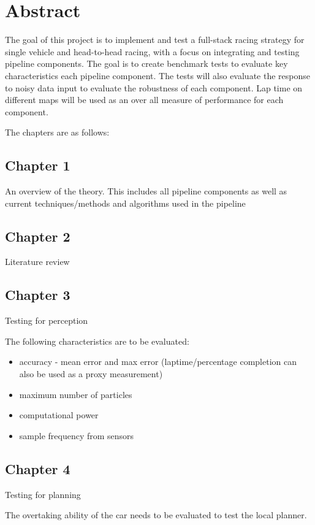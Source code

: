 \chapter{Abstract}

The goal of this project is to implement and test a full-stack racing strategy for single vehicle and head-to-head racing, with a focus on integrating and testing pipeline components. The goal is to create benchmark tests to evaluate key characteristics each pipeline component. The tests will also evaluate the response to noisy data input to evaluate the robustness of each component. Lap time on different maps will be used as an over all measure of performance for each component.

The chapters are as follows:
\section{Chapter 1}
An overview of the theory. This includes all pipeline components as well as current techniques/methods and algorithms used in the pipeline
\section{Chapter 2}
Literature review
\section{Chapter 3}
Testing for perception

The following characteristics are to be evaluated:
\begin{itemize}
    \item accuracy - mean error and max error (laptime/percentage completion can also be used as a proxy measurement)
    \item maximum number of particles
    \item computational power
    \item sample frequency from sensors
\end{itemize}

\section{Chapter 4}
Testing for planning

The overtaking ability of the car needs to be evaluated to test the local planner.

